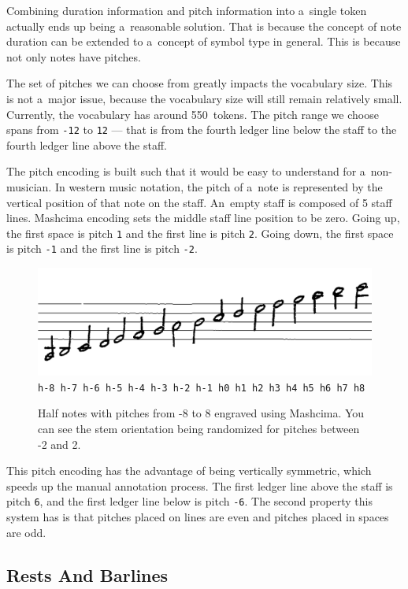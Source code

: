 Combining duration information and pitch information into a~single token actually ends up being a~reasonable solution. That is because the concept of note duration can be extended to a~concept of symbol type in general. This is because not only notes have pitches.

The set of pitches we can choose from greatly impacts the vocabulary size. This is not a~major issue, because the vocabulary size will still remain relatively small. Currently, the vocabulary has around 550~tokens. The pitch range we choose spans from \texttt{-12} to \texttt{12} --- that is from the fourth ledger line below the staff to the fourth ledger line above the staff.

The pitch encoding is built such that it would be easy to understand for a~non-musician. In western music notation, the pitch of a~note is represented by the vertical position of that note on the staff. An~empty staff is composed of 5 staff lines. Mashcima encoding sets the middle staff line position to be zero. Going up, the first space is pitch \texttt{1} and the first line is pitch \texttt{2}. Going down, the first space is pitch \texttt{-1} and the first line is pitch \texttt{-2}.

\begin{figure}[h]
    \centering
    \includegraphics[width=120mm]{../img/rising-half-notes}
    \verb`h-8 h-7 h-6 h-5 h-4 h-3 h-2 h-1 h0 h1 h2 h3 h4 h5 h6 h7 h8`
    \caption{Half notes with pitches from -8 to 8 engraved using Mashcima. You can see the stem orientation being randomized for pitches between -2 and 2.}
    \label{fig4:RisingHalfNotes}
\end{figure}

This pitch encoding has the advantage of being vertically symmetric, which speeds up the manual annotation process. The first ledger line above the staff is pitch \texttt{6}, and the first ledger line below is pitch \texttt{-6}. The second property this system has is that pitches placed on lines are even and pitches placed in spaces are odd.


\subsection{Rests And Barlines}

